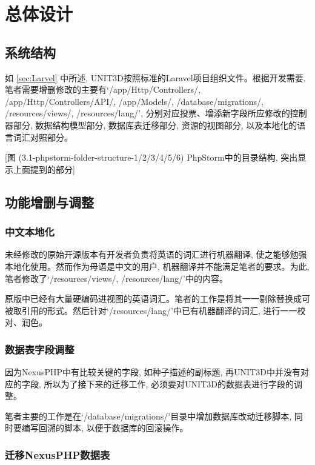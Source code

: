\chapter{总体设计}
\label{cha:design}

\section{系统结构}

如 \ref{sec:Larvel} 中所述, UNIT3D按照标准的Laravel项目组织文件。根据开发需要, 笔者需要增删修改的主要有`/app/Http/Controllers/, /app/Http/Controllers/API/, /app/Models/, /database/migrations/, /resources/views/, /resources/lang/', 分别对应投票、增添新字段所应修改的控制器部分, 数据结构模型部分, 数据库表迁移部分, 资源的视图部分, 以及本地化的语言词汇对照部分。

[图 (3.1-phpstorm-folder-structure-1/2/3/4/5/6) PhpStorm中的目录结构, 突出显示上面提到的部分]


\section{功能增删与调整}

\subsection{中文本地化}

未经修改的原始开源版本有开发者负责将英语的词汇进行机器翻译, 使之能够勉强本地化使用。然而作为母语是中文的用户, 机器翻译并不能满足笔者的要求。为此, 笔者修改了`/resources/views/, /resources/lang/'中的内容。

原版中已经有大量硬编码进视图的英语词汇。笔者的工作是将其一一剔除替换成可被取引用的形式。然后针对`/resources/lang/'中已有机器翻译的词汇, 进行一一校对、润色。


\subsection{数据表字段调整}

因为NexusPHP中有比较关键的字段, 如种子描述的副标题, 再UNIT3D中并没有对应的字段, 所以为了接下来的迁移工作, 必须要对UNIT3D的数据表进行字段的调整。

笔者主要的工作是在`/database/migrations/'目录中增加数据库改动迁移脚本, 同时要编写回溯的脚本, 以便于数据库的回滚操作。

\subsection{迁移NexusPHP数据表}

